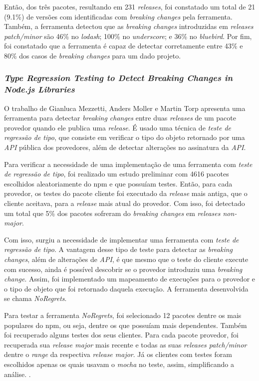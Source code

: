 Então, dos três pacotes, resultando em 231 \textit{releases}, foi constatado um total de 21 (9.1\%) de versões com identificadas com \textit{breaking changes} pela ferramenta. Também, a ferramenta detectou que as \textit{breaking changes} introduzidas em \textit{releases patch/minor} são 46\% no \textit{lodash}; 100\% no \textit{underscore}; e 36\% no \textit{bluebird}. Por fim, foi constatado que a ferramenta é capaz de detectar corretamente entre 43\% e 80\% dos casos de \textit{breaking changes} para um dado projeto.

\subsubsection{\textit{Type Regression Testing to Detect Breaking Changes in Node.js Libraries}}

O trabalho de Gianluca Mezzetti, Anders Moller e Martin Torp apresenta uma ferramenta para detectar \textit{breaking changes} entre duas \textit{releases} de um pacote provedor quando ele publica uma \textit{release}. É usado uma técnica de \textit{teste de regressão de tipo}, que consiste em verificar o tipo do objeto retornado por uma \textit{API} pública dos provedores, além de detectar alterações no assinatura da \textit{API}.

Para verificar a necessidade de uma implementação de uma ferramenta com \textit{teste de regressão de tipo}, foi realizado um estudo preliminar com 4616 pacotes escolhidos aleatoriamente do \gls{npm} e que possuíam testes. Então, para cada provedor, os testes do pacote cliente foi executado da \textit{release} mais antiga, que o cliente aceitava, para a \textit{release} mais atual do provedor. Com isso, foi detectado um total que 5\% dos pacotes sofreram do \textit{breaking changes} em \textit{releases non-major}.

Com isso, surgiu a necessidade de implementar uma ferramenta com \textit{teste de regressão de tipo}. A vantagem desse tipo de teste para detectar as \textit{breaking changes}, além de alterações de \textit{API}, é que mesmo que o teste do cliente execute com sucesso, ainda é possível descobrir se o provedor introduziu uma \textit{breaking change}. Assim, foi implementado um mapeamento de execuções para o provedor e o tipo de objeto que foi retornado daquela execução. A ferramenta desenvolvida se chama \textit{NoRegrets}.

Para testar a ferramenta \textit{NoRegrets}, foi selecionado 12 pacotes dentre os mais populares do \gls{npm}, ou seja, dentre os que possuíam mais dependentes. Também foi recuperado alguns testes dos seus clientes. Para cada pacote provedor, foi recuperada sua \textit{release major} mais recente e todas as suas \textit{releases patch/minor} dentre o \textit{range} da respectiva \textit{release major}. Já os clientes com testes foram escolhidos apenas os quais usavam o \textit{mocha} no teste, assim, simplificando a análise. .

